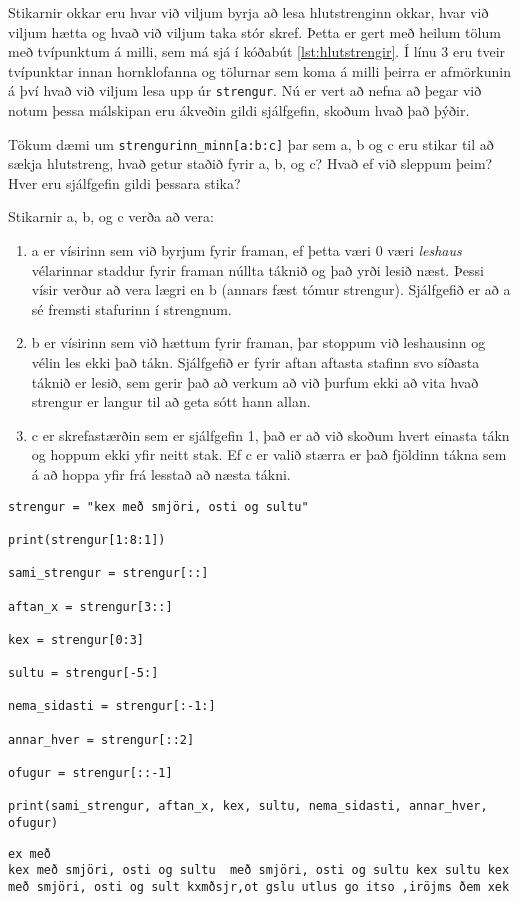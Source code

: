 Stikarnir okkar eru hvar við viljum byrja að lesa hlutstrenginn okkar, hvar við viljum hætta og hvað við viljum taka stór skref.
Þetta er gert með heilum tölum með tvípunktum á milli, sem má sjá í kóðabút \ref{lst:hlutstrengir}.
Í línu 3 eru tveir tvípunktar innan hornklofanna og tölurnar sem koma á milli þeirra er afmörkunin á því hvað við viljum lesa upp úr \texttt{strengur}.
Nú er vert að nefna að þegar við notum þessa málskipan eru ákveðin gildi sjálfgefin, skoðum hvað það þýðir.

Tökum dæmi um \texttt{strengurinn\_minn[a:b:c]} þar sem a, b og c eru stikar til að sækja hlutstreng, hvað getur staðið fyrir a, b, og c? Hvað ef við sleppum þeim? Hver eru sjálfgefin gildi þessara stika?

Stikarnir a, b, og c verða að vera:
\begin{enumerate}
	\item a er vísirinn sem við byrjum fyrir framan, ef þetta væri 0 væri \textit{leshaus} vélarinnar staddur fyrir framan núllta táknið og það yrði lesið næst.
	Þessi vísir verður að vera lægri en b (annars fæst tómur strengur).
	Sjálfgefið er að a sé fremsti stafurinn í strengnum.
	\item b er vísirinn sem við hættum fyrir framan, þar stoppum við leshausinn og vélin les ekki það tákn.
	Sjálfgefið er fyrir aftan aftasta stafinn svo síðasta táknið er lesið, sem gerir það að verkum að við þurfum ekki að vita hvað strengur er langur til að geta sótt hann allan.
	\item c er skrefastærðin sem er sjálfgefin 1, það er að við skoðum hvert einasta tákn og hoppum ekki yfir neitt stak.
	Ef c er valið stærra er það fjöldinn tákna sem á að hoppa yfir frá lesstað að næsta tákni.
\end{enumerate}

\begin{lstlisting}[caption=Hlutstrengir, label=lst:hlutstrengir]
strengur = "kex með smjöri, osti og sultu"

print(strengur[1:8:1])

sami_strengur = strengur[::]

aftan_x = strengur[3::]

kex = strengur[0:3]

sultu = strengur[-5:]

nema_sidasti = strengur[:-1:]

annar_hver = strengur[::2]

ofugur = strengur[::-1]

print(sami_strengur, aftan_x, kex, sultu, nema_sidasti, annar_hver, ofugur)
\end{lstlisting}
\lstset{style=uttak}
\begin{lstlisting}
ex með 
kex með smjöri, osti og sultu  með smjöri, osti og sultu kex sultu kex með smjöri, osti og sult kxmðsjr,ot gslu utlus go itso ,iröjms ðem xek
\end{lstlisting}
\lstset{style=venjulegt}

